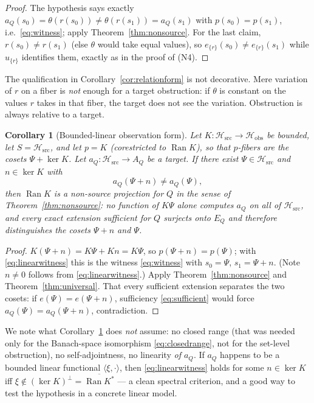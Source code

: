 \documentclass[11pt,reqno]{amsart}
\theoremstyle{plain}
\newtheorem{corollary}[theorem]{Corollary}
\theoremstyle{definition}
\theoremstyle{remark}
\DeclareMathOperator{\Ran}{Ran}
\newcommand{\Hsrc}{\mathcal{H}_{\mathrm{src}}}
\newcommand{\Hobs}{\mathcal{H}_{\mathrm{obs}}}
\begin{document}
\begin{proof}
The hypothesis says exactly $a_Q(s_0)=\theta(r(s_0))\neq\theta(r(s_1))=a_Q(s_1)$ with $p(s_0)=p(s_1)$, i.e.\ \eqref{eq:witness}; apply Theorem~\ref{thm:nonsource}. For the last claim, $r(s_0)\neq r(s_1)$ (else $\theta$ would take equal values), so $e_{\{r\}}(s_0)\neq e_{\{r\}}(s_1)$ while $u_{\{r\}}$ identifies them, exactly as in the proof of (N4).
\end{proof}

The qualification in Corollary~\ref{cor:relationform} is not decorative. Mere variation of $r$ on a fiber is \emph{not} enough for a target obstruction: if $\theta$ is constant on the values $r$ takes in that fiber, the target does not see the variation. Obstruction is always relative to a target.

\begin{corollary}[Bounded-linear observation form]\label{cor:linear}
Let $K\colon\Hsrc\to\Hobs$ be bounded, let $S=\Hsrc$, and let $p=K$ (corestricted to $\Ran K$), so that $p$-fibers are the cosets $\Psi+\ker K$. Let $a_Q\colon\Hsrc\to A_Q$ be a target. If there exist $\Psi\in\Hsrc$ and $n\in\ker K$ with
\begin{equation}\label{eq:linearwitness}
a_Q(\Psi+n)\neq a_Q(\Psi),
\end{equation}
then $\Ran K$ is a non-source projection for $Q$ in the sense of Theorem~\ref{thm:nonsource}: no function of $K\Psi$ alone computes $a_Q$ on all of $\Hsrc$, and every exact extension sufficient for $Q$ surjects onto $E_Q$ and therefore distinguishes the cosets $\Psi+n$ and $\Psi$.
\end{corollary}

\begin{proof}
$K(\Psi+n)=K\Psi+Kn=K\Psi$, so $p(\Psi+n)=p(\Psi)$; with \eqref{eq:linearwitness} this is the witness \eqref{eq:witness} with $s_0=\Psi$, $s_1=\Psi+n$. (Note $n\neq0$ follows from \eqref{eq:linearwitness}.) Apply Theorem~\ref{thm:nonsource} and Theorem~\ref{thm:universal}. That every sufficient extension separates the two cosets: if $e(\Psi)=e(\Psi+n)$, sufficiency \eqref{eq:sufficient} would force $a_Q(\Psi)=a_Q(\Psi+n)$, contradiction.
\end{proof}

We note what Corollary~\ref{cor:linear} does \emph{not} assume: no closed range (that was needed only for the Banach-space isomorphism \eqref{eq:closedrange}, not for the set-level obstruction), no self-adjointness, no linearity \emph{of $a_Q$}. If $a_Q$ happens to be a bounded linear functional $\langle\xi,\cdot\rangle$, then \eqref{eq:linearwitness} holds for some $n\in\ker K$ iff $\xi\notin(\ker K)^{\perp}=\overline{\Ran K^{*}}$ --- a clean spectral criterion, and a good way to test the hypothesis in a concrete linear model.
\end{document}
